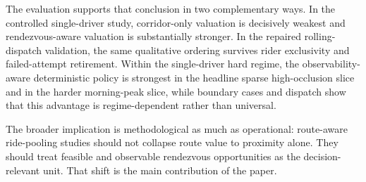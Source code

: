 \documentclass[journal]{IEEEtran}
\begin{document}
The evaluation supports that conclusion in two complementary ways. In the controlled single-driver study, corridor-only valuation is decisively weakest and rendezvous-aware valuation is substantially stronger. In the repaired rolling-dispatch validation, the same qualitative ordering survives rider exclusivity and failed-attempt retirement. Within the single-driver hard regime, the observability-aware deterministic policy is strongest in the headline sparse high-occlusion slice and in the harder morning-peak slice, while boundary cases and dispatch show that this advantage is regime-dependent rather than universal.

The broader implication is methodological as much as operational: route-aware ride-pooling studies should not collapse route value to proximity alone. They should treat feasible and observable rendezvous opportunities as the decision-relevant unit. That shift is the main contribution of the paper.



\end{document}
